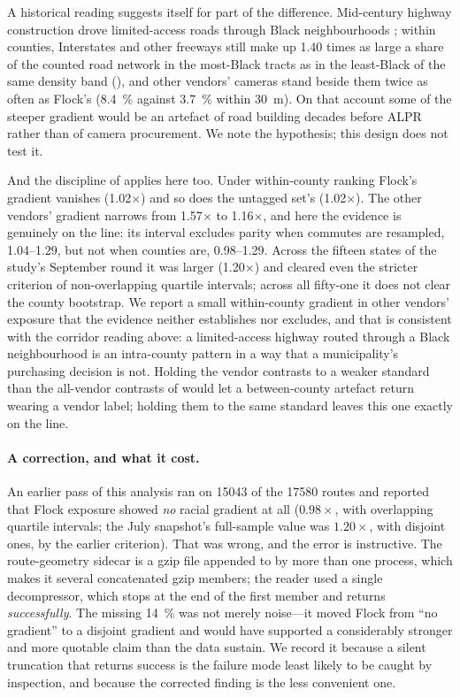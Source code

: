 \documentclass[11pt,twoside]{article}
\newcommand{\alpr}{ALPR\xspace}
\begin{document}
A historical reading suggests itself for part of the difference. Mid-century highway
construction drove limited-access roads through Black neighbourhoods \citep{archer2020}; within
counties, Interstates and other freeways still make up \num{1.40} times as large a share of the
counted road network in the most-Black tracts as in the least-Black of the same density band
(), and other vendors' cameras stand beside them twice as often as
Flock's (\SI{8.4}{\percent} against \SI{3.7}{\percent} within \SI{30}{\metre}). On that account
some of the steeper gradient would be an artefact of road building decades before \alpr rather
than of camera procurement. We note the hypothesis; this design does not test it.

And the discipline of  applies here too. Under within-county
ranking Flock's gradient vanishes (\num{1.02}$\times$) and so does the untagged set's
(\num{1.02}$\times$). The other vendors' gradient narrows from \num{1.57}$\times$ to
\num{1.16}$\times$, and here the evidence is genuinely on the line: its interval excludes parity
when commutes are resampled, 1.04--1.29, but not when counties are, 0.98--1.29. Across the
fifteen states of the study's September round it was larger (\num{1.20}$\times$) and cleared
even the stricter criterion of non-overlapping quartile intervals; across all fifty-one it does
not clear the county bootstrap. We report a small within-county gradient in other vendors'
exposure that the evidence neither establishes nor excludes, and that is consistent with the
corridor reading above: a limited-access highway routed through a Black neighbourhood is an
intra-county pattern in a way that a municipality's purchasing decision is not. Holding the
vendor contrasts to a weaker standard than the all-vendor contrasts of
 would let a between-county artefact return wearing
a vendor label; holding them to the same standard leaves this one exactly on the line.

\paragraph{A correction, and what it cost.}
An earlier pass of this analysis ran on \num{15043} of the \num{17580} routes and reported
that Flock exposure showed \emph{no} racial gradient at all ($\num{0.98}\times$, with
overlapping quartile intervals; the July snapshot's full-sample value was $\num{1.20}\times$,
with disjoint ones, by the earlier criterion).
That was wrong, and the error is instructive. The route-geometry sidecar is
a gzip file appended to by more than one process, which makes it several concatenated gzip
members; the reader used a single decompressor, which stops at the end of the first member
and returns \emph{successfully}. The missing \SI{14}{\percent} was not merely noise---it
moved Flock from ``no gradient'' to a disjoint gradient and would have supported
a considerably stronger and more quotable claim than the data sustain. We record it
because a silent truncation that returns success is the failure mode least likely to be
caught by inspection, and because the corrected finding is the less convenient one.
\end{document}
